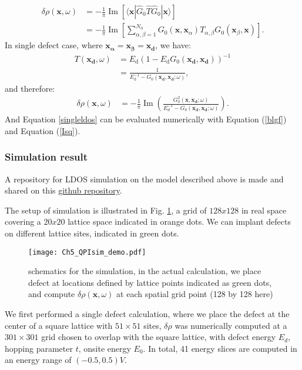 \begin{align}
	\delta\rho(\mathbf{x},\omega) &= - \frac{1}{\pi} \operatorname{Im} \left[ \langle \mathbf{x} | \hat{G}_0 \hat{T} \hat{G}_0 | \mathbf{x} \rangle \right] \\
	&= -\frac{1}{\pi} \operatorname{Im} \left[\sum_{\alpha, \beta=1}^{N_{\text{d}}} G_0(\mathbf{x}, \mathbf{x}_\alpha) T_{\alpha, \beta} G_0(\mathbf{x}_\beta, \mathbf{x})\right]. \label{multi_defect_eq}
\end{align}
In single defect case, where $\mathbf{x_\alpha} = \mathbf{x_\beta} = \mathbf{x_d}$, we have: 
\begin{align}
	T(\mathbf{x_d},\omega) &= E_{\text{d}} \left( 1 - E_{\text{d}} G_0(\mathbf{x_d}, \mathbf{x_d}) \right)^{-1} \label{T_matrix_ele} \\
	&= \frac{1}{E_{\text{d}}^{-1} - G_0(\mathbf{x_d}, \mathbf{x_d}; \omega)},
\end{align}
and therefore: 
\begin{align}
	\delta\rho(\mathbf{x},\omega) &= - \frac{1}{\pi} \operatorname{Im}(\frac{G_0^2(\mathbf{x},\mathbf{x_d};\omega)}{E_d^{-1} - G_0(\mathbf{x_d},\mathbf{x_d};\omega)}) \label{singleldos}. 
\end{align}
And Equation \ref{singleldos} can be evaluated numerically with Equation (\ref{blgf}) and Equation (\ref{Isq}).

\subsubsection{Simulation result}
A repository for \ac{LDOS} simulation on the model described above is made and shared on this \href{https://github.com/Plswearpants/QPI\_simulation}{github repository}.

The setup of simulation is illustrated in Fig. \ref{fig:ch5_qpisim_demo}, a grid of $128x128$ in real space covering a $20x20$ lattice space indicated in orange dots. We can implant defects on different lattice sites, indicated in green dots. 

\begin{figure}
	\centering
	\texttt{[image: Ch5\_QPIsim\_demo.pdf]}
	\caption{schematics for the simulation, in the actual calculation, we place defect at locations defined by lattice points indicated as green dots, and compute $\delta\rho(\textbf{x},\omega)$ at each spatial grid point (128 by 128 here)}
	\label{fig:ch5_qpisim_demo}
\end{figure}

We first performed a single defect calculation, where we place the defect at the center of a square lattice with $51\times51$ sites, $\delta\rho$ was numerically computed at a $301\times301$ grid chosen to overlap with the square lattice, with defect energy $E_d$, hopping parameter $t$, onsite energy $E_0$. In total, 41 energy slices are computed in an energy range of $(-0.5, 0.5)V$.  

